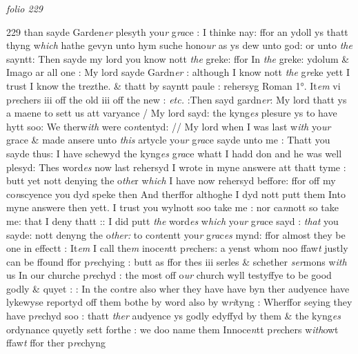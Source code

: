 \documentclass[12pt, a4paper]{book}
\begin{document}
\dotfill
					

\textit{folio 229}


{\color{Mahogany}229} than sayde Garden\textit{er} plesyth you\textit{r} g\textit{ra}ce : I thinke nay: ffor an ydoll ys thatt thyng w\textit{hich} hathe gevyn unto hym suche hono\textit{ur} as ys dew unto god: or unto \textit{the} sayntt: Then sayde my lord you know nott \textit{the} greke: ffor In \textit{the} greke: ydolum \& Imago ar all one : My  lord sayde Gardn\textit{er} : although I know nott \textit{the} g\textit{re}ke yett I trust  I know the trezthe. \& thatt by sayntt paule : rehersyg Roman 1°.  It\textit{em} vi p\textit{re}chers iii off the old iii off the new : \textit{etc.} :Then sayd gardn\textit{er}: My  lord thatt ys a maene to sett us att varyance / My  lord sayd: the kyng\textit{es} plesure ys to have hytt soo: We therw\textit{ith} were co\textit{n}tentyd: // My lord when I was last w\textit{ith} yo\textit{ur} grace \& made ansere unto \textit{this} artycle yo\textit{ur} g\textit{ra}ce sayde unto me : Thatt you sayde thus: I have schewyd the kyng\textit{es} g\textit{ra}ce whatt I hadd don and he was well plesyd: Thes word\textit{es} now last rehersyd I wrote in myne answere att thatt tyme
			 : butt yet
			 nott denying the o\textit{the}r w\textit{hich} I have now rehersyd beffore: ffor off my co\textit{n}scyence you dyd speke then And therffor althoghe I dyd nott putt them Into myne answere then
			 yett. I trust you wylnott soo take me : nor ca\textit{n}nott so take me: that I deny thatt :: I did
			 putt \textit{the} word\textit{es} w\textit{hich} yo\textit{ur} g\textit{ra}ce sayd : \textit{that} you sayde: nott denyng the o\textit{ther:} to co\textit{n}tentt you\textit{r} g\textit{ra}c\textit{es} mynd: ffor almost they be one in effectt : It\textit{em} I call the\textit{m} inoce\textit{n}tt p\textit{re}chers: a yenst whom noo ffaw\textit{t} justly can be ffound ffor p\textit{re}chying : butt as ffor thes iii serles \& schether \textit{ser}mons w\textit{ith} us In our churche p\textit{re}chyd : the most off o\textit{ur} church wyll testyffye to be  good godly \& quyet : : In the co\textit{n}tre also wher they have have byn ther audyence have lykewyse reportyd off them bothe by word also by w\textit{ri}tyng : Wherffor seying they have p\textit{re}chyd soo : thatt \textit{ther} audyence ys godly edyffyd by them \& the kyng\textit{es} ordynance quyetly sett forthe : we doo name them Innoce\textit{n}tt p\textit{re}chers w\textit{ith}owt ffaw\textit{t }ffor ther p\textit{re}chyng
\end{document}
